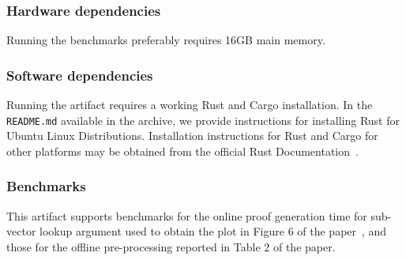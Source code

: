 \documentclass[sigconf]{acmart}
\begin{document}
	
	
	\subsubsection{Hardware dependencies}
	Running the benchmarks preferably requires 16GB main memory.
	
	
	\subsubsection{Software dependencies}
	Running the artifact requires a working Rust and Cargo installation. In the {\tt README.md}
	available in the archive, we provide instructions for installing Rust for Ubuntu Linux Distributions.
	Installation instructions for Rust and Cargo for other platforms may be obtained from the official Rust Documentation~\cite{rust-doc}.

	
	
	\subsubsection{Benchmarks}
	This artifact supports benchmarks for the online proof generation time for sub-vector lookup argument
	used to obtain the plot in Figure 6 of the paper~\cite{full-ver}, and those for the offline pre-processing
	reported in Table 2 of the paper.
	
\end{document}
